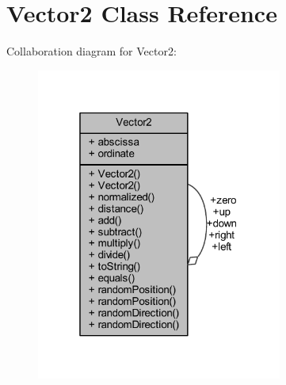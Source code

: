 \hypertarget{class_vector2}{}\section{Vector2 Class Reference}
\label{class_vector2}


Collaboration diagram for Vector2\+:
\nopagebreak
\begin{figure}[H]
\begin{center}
\leavevmode
\includegraphics[width=229pt]{class_vector2__coll__graph}
\end{center}
\end{figure}
